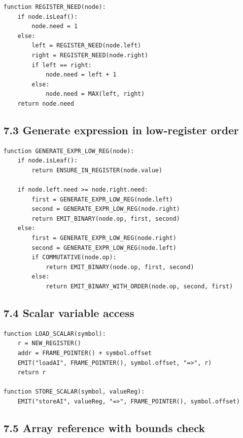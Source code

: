 \documentclass[10pt,letterpaper]{article}
\begin{document}
\begin{verbatim}
function REGISTER_NEED(node):
    if node.isLeaf():
        node.need = 1
    else:
        left = REGISTER_NEED(node.left)
        right = REGISTER_NEED(node.right)
        if left == right:
            node.need = left + 1
        else:
            node.need = MAX(left, right)
    return node.need
\end{verbatim}

\subsection*{7.3 Generate expression in low-register order}
{}

\begin{verbatim}
function GENERATE_EXPR_LOW_REG(node):
    if node.isLeaf():
        return ENSURE_IN_REGISTER(node.value)

    if node.left.need >= node.right.need:
        first = GENERATE_EXPR_LOW_REG(node.left)
        second = GENERATE_EXPR_LOW_REG(node.right)
        return EMIT_BINARY(node.op, first, second)
    else:
        first = GENERATE_EXPR_LOW_REG(node.right)
        second = GENERATE_EXPR_LOW_REG(node.left)
        if COMMUTATIVE(node.op):
            return EMIT_BINARY(node.op, first, second)
        else:
            return EMIT_BINARY_WITH_ORDER(node.op, second, first)
\end{verbatim}

\subsection*{7.4 Scalar variable access}
{}

\begin{verbatim}
function LOAD_SCALAR(symbol):
    r = NEW_REGISTER()
    addr = FRAME_POINTER() + symbol.offset
    EMIT("loadAI", FRAME_POINTER(), symbol.offset, "=>", r)
    return r

function STORE_SCALAR(symbol, valueReg):
    EMIT("storeAI", valueReg, "=>", FRAME_POINTER(), symbol.offset)
\end{verbatim}

\subsection*{7.5 Array reference with bounds check}
{}
\end{document}
